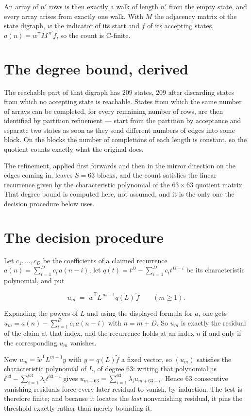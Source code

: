 \documentclass[11pt]{article}
\theoremstyle{definition}
\begin{document}
An array of $n'$ rows is then exactly a walk of length $n'$ from the empty state, and every array arises from exactly one walk. With $M$ the adjacency matrix of the state digraph, $w$ the indicator of its start and $f$ of its accepting states, $a(n) = w^{\mathsf T}M^{\,n'}f$, so the count is C-finite.

\section{The degree bound, derived}

The reachable part of that digraph has $209$ states, $209$ after discarding states from which no accepting state is reachable. States from which the same number of arrays can be completed, for every remaining number of rows, are then identified by partition refinement --- start from the partition by acceptance and separate two states as soon as they send different numbers of edges into some block. On the blocks the number of completions of each length is constant, so the quotient counts exactly what the original does.

The refinement, applied first forwards and then in the mirror direction on the edges coming in, leaves $S = 63$ blocks, and the count satisfies the linear recurrence given by the characteristic polynomial of the $63 \times 63$ quotient matrix. That degree bound is computed here, not assumed, and it is the only one the decision procedure below uses.

\section{The decision procedure}

Let $c_1,\dots,c_D$ be the coefficients of a claimed recurrence $a(n) = \sum_{i=1}^{D} c_i\,a(n-i)$, let $q(t) = t^{D} - \sum_{i=1}^{D} c_i t^{D-i}$ be its characteristic polynomial, and put

\[u_m \;=\; \tilde w^{\mathsf T} L^{\,m-1} q(L)\,\tilde f \qquad (m \ge 1).\]

Expanding the powers of $L$ and using the displayed formula for $a$, one gets $u_m = a(n) - \sum_{i=1}^{D} c_i\,a(n-i)$ with $n = m + D$. So $u_m$ is exactly the residual of the claim at that index, and the recurrence holds at an index $n$ if and only if the corresponding $u_m$ vanishes.

Now $u_m = \tilde w^{\mathsf T} L^{m-1} y$ with $y = q(L)\tilde f$ a fixed vector, so $(u_m)$ satisfies the characteristic polynomial of $L$, of degree $63$: writing that polynomial as $t^{63} - \sum_{i=1}^{63} \lambda_i t^{63-i}$ gives $u_{m+63} = \sum_{i=1}^{63} \lambda_i u_{m+63-i}$. Hence $63$ consecutive vanishing residuals force every later residual to vanish, by induction. The test is therefore finite; and because it locates the {\itshape last} nonvanishing residual, it pins the threshold exactly rather than merely bounding it.
\end{document}
